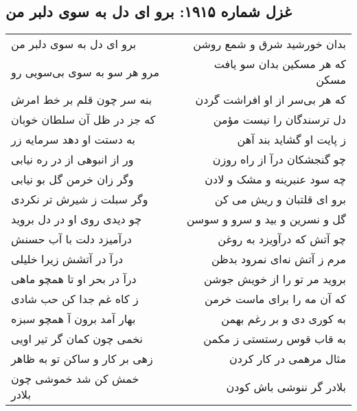 \begin{center}
\section*{غزل شماره ۱۹۱۵: برو ای دل به سوی دلبر من}
\label{sec:1915}
\begin{longtable}{l p{0.5cm} r}
برو ای دل به سوی دلبر من
&&
بدان خورشید شرق و شمع روشن
\\
مرو هر سو به سوی بی‌سویی رو
&&
که هر مسکین بدان سو یافت مسکن
\\
بنه سر چون قلم بر خط امرش
&&
که هر بی‌سر از او افراشت گردن
\\
که جز در ظل آن سلطان خوبان
&&
دل ترسندگان را نیست مؤمن
\\
به دستت او دهد سرمایه زر
&&
ز پایت او گشاید بند آهن
\\
ور از انبوهی از در ره نیابی
&&
چو گنجشکان درآ از راه روزن
\\
وگر زان خرمن گل بو نیابی
&&
چه سود عنبرینه و مشک و لادن
\\
وگر سبلت ز شیرش تر نکردی
&&
برو ای قلتبان و ریش می کن
\\
چو دیدی روی او در دل بروید
&&
گل و نسرین و بید و سرو و سوسن
\\
درآمیزد دلت با آب حسنش
&&
چو آتش که درآویزد به روغن
\\
درآ در آتشش زیرا خلیلی
&&
مرم ز آتش نه‌ای نمرود بدظن
\\
درآ در بحر او تا همچو ماهی
&&
بروید مر تو را از خویش جوشن
\\
ز کاه غم جدا کن حب شادی
&&
که آن مه را برای ماست خرمن
\\
بهار آمد برون آ همچو سبزه
&&
به کوری دی و بر رغم بهمن
\\
نخمی چون کمان گر تیر اویی
&&
به قاب قوس رستستی ز مکمن
\\
زهی بر کار و ساکن تو به ظاهر
&&
مثال مرهمی در کار کردن
\\
خمش کن شد خموشی چون بلادر
&&
بلادر گر ننوشی باش کودن
\\
\end{longtable}
\end{center}
